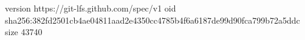 version https://git-lfs.github.com/spec/v1
oid sha256:382fd2501cb4ae04811aad2e4350cc4785b4f6a6187de99d90fca799b72a5ddc
size 43740
